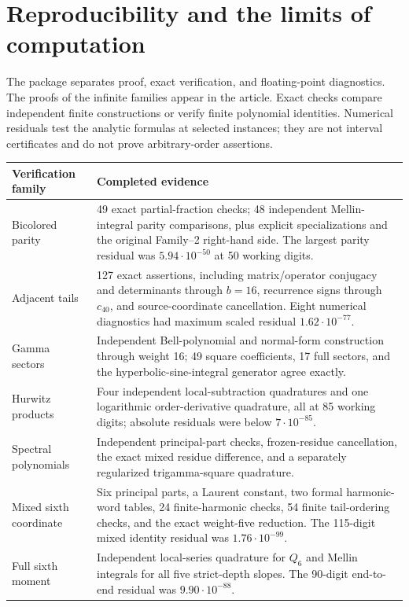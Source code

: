 \documentclass[11pt,a4paper]{article}
\numberwithin{equation}{section}
\theoremstyle{definition}
\theoremstyle{remark}
\begin{document}


\section{Reproducibility and the limits of computation}
\label{repro:sec}

The package separates proof, exact verification, and floating-point
diagnostics.  The proofs of the infinite families appear in the
article.  Exact checks compare independent finite constructions or
verify finite polynomial identities.  Numerical residuals test the
analytic formulas at selected instances; they are not interval
certificates and do not prove arbitrary-order assertions.

\begin{center}
\small
\begin{tabularx}{\textwidth}{@{}p{}X@{}}
\toprule
Verification family & Completed evidence \\
\midrule
Bicolored parity & 49 exact partial-fraction checks; 48 independent
Mellin-integral parity comparisons, plus explicit specializations and
the original Family--2 right-hand side.  The largest parity residual
was $5.94\cdot10^{-50}$ at 50 working digits. \\
Adjacent tails & 127 exact assertions, including matrix/operator
conjugacy and determinants through $b=16$, recurrence signs through
$c_{40}$, and source-coordinate cancellation.  Eight numerical
diagnostics had maximum scaled residual $1.62\cdot10^{-77}$. \\
Gamma sectors & Independent Bell-polynomial and normal-form construction
through weight 16; 49 square coefficients, 17 full sectors, and the
hyperbolic-sine-integral generator agree exactly. \\
Hurwitz products & Four independent local-subtraction quadratures and
one logarithmic order-derivative quadrature, all at 85 working digits;
absolute residuals were below $7\cdot10^{-85}$. \\
Spectral polynomials & Independent principal-part checks, frozen-residue
cancellation, the exact mixed residue difference, and a separately
regularized trigamma-square quadrature. \\
Mixed sixth coordinate & Six principal parts, a Laurent constant,
two formal harmonic-word tables, 24 finite-harmonic checks, 54 finite
tail-ordering checks, and the exact weight-five reduction.  The
115-digit mixed identity residual was $1.76\cdot10^{-99}$. \\
Full sixth moment & Independent local-series quadrature for $Q_6$ and
Mellin integrals for all five strict-depth slopes.  The 90-digit
end-to-end residual was $9.90\cdot10^{-88}$. \\
\bottomrule
\end{tabularx}
\end{center}
\end{document}
